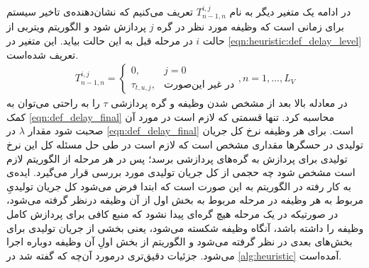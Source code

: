 در ادامه یک متغیر دیگر به نام $T_{n-1,n}^{i,j}$ تعریف می‌کنیم که نشان‌دهنده‌ی تاخیر سیستم برای زمانی است که وظیفه مورد نظر در گره $j$ پردازش شود و الگوریتم ویتربی از حالت $i$ در مرحله قبل به این حالت بیاید. این متغیر در \cref{eqn:heuristic:def_delay_level} تعریف شده‌است. 
\begin{align}\label{eqn:heuristic:def_delay_level}
	T_{n-1,n}^{i,j} =
	\begin{cases}
		0,				& \text{$j = 0$} \\
		\tau_{t,u,j},  	& \text{در غیر این‌صورت}
	\end{cases}
	,n = 1, \dots, L_V
\end{align}
در معادله بالا بعد از مشخص شدن وظیفه و گره پردازشی $\tau$ را به راحتی می‌توان به کمک \cref{eqn:def_delay_final} محاسبه کرد. تنها قسمتی که لازم است در مورد آن صحبت شود مقدار $\lambda$ در \cref{eqn:def_delay_final} است. برای هر وظیفه نرخ کل جریان تولیدی در حسگرها مقداری مشخص است که لازم است در طی حل مسئله کل این نرخ تولیدی برای پردازش به گره‌های پردازشی برسد؛ پس در هر مرحله از الگوریتم لازم است مشخص شود چه حجمی از کل جریان تولیدی مورد بررسی قرار می‌گیرد. ایده‌ی به کار رفته در الگوریتم به این صورت است که ابتدا فرض می‌شود کل جریان تولیدیِ مربوط به هر وظیفه در مرحله مربوط به بخش اول از آن وظیفه درنظر گرفته می‌شود، در صورتیکه در یک مرحله هیچ گره‌ای پیدا نشود که منبع کافی برای پردازش کامل وظیفه را داشته باشد، آنگاه وظیفه شکسته می‌شود، یعنی بخشی از جریان تولیدی برای بخش‌های بعدی در نظر گرفته می‌شود و الگوریتم از بخش اولِ آن وظیفه دوباره اجرا می‌شود. جزئیات دقیق‌تری درمورد آن‌چه که گفته شد در \cref{alg:heuristic} آمده‌است. 

